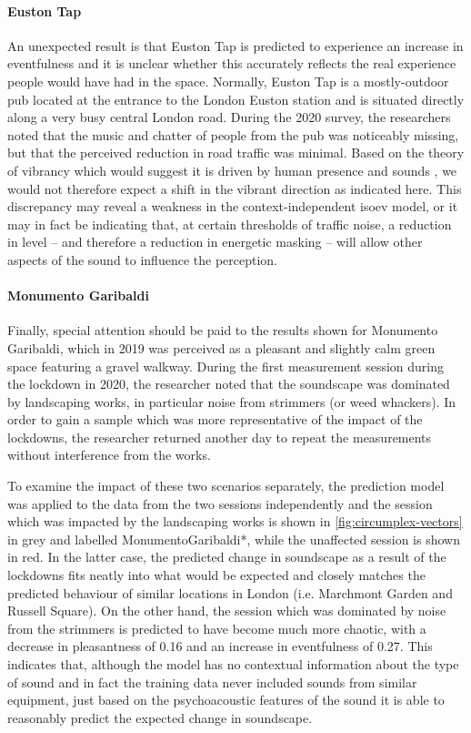    \paragraph{Euston Tap} An unexpected result is that Euston Tap is predicted to experience an increase in eventfulness and it is unclear whether this accurately reflects the real experience people would have had in the space. Normally, Euston Tap is a mostly-outdoor pub located at the entrance to the London Euston station and is situated directly along a very busy central London road. During the 2020 survey, the researchers noted that the music and chatter of people from the pub was noticeably missing, but that the perceived reduction in road traffic was minimal. Based on the theory of vibrancy which would suggest it is driven by human presence and sounds \citep{Aletta2018Towards}, we would not therefore expect a shift in the vibrant direction as indicated here. This discrepancy may reveal a weakness in the context-independent \gls{isoev} model, or it may in fact be indicating that, at certain thresholds of traffic noise, a reduction in level -- and therefore a reduction in energetic masking -- will allow other aspects of the sound to influence the perception.

   \paragraph{Monumento Garibaldi} Finally, special attention should be paid to the results shown for Monumento Garibaldi, which in 2019 was perceived as a pleasant and slightly calm green space featuring a gravel walkway. During the first measurement session during the lockdown in 2020, the researcher noted that the soundscape was dominated by landscaping works, in particular noise from strimmers (or weed whackers). In order to gain a sample which was more representative of the impact of the lockdowns, the researcher returned another day to repeat the measurements without interference from the works.

   To examine the impact of these two scenarios separately, the prediction model was applied to the data from the two sessions independently and the session which was impacted by the landscaping works is shown in \cref{fig:circumplex-vectors} in grey and labelled MonumentoGaribaldi*, while the unaffected session is shown in red. In the latter case, the predicted change in soundscape as a result of the lockdowns fits neatly into what would be expected and closely matches the predicted behaviour of similar locations in London (i.e. Marchmont Garden and Russell Square). On the other hand, the session which was dominated by noise from the strimmers is predicted to have become much more chaotic, with a decrease in pleasantness of 0.16 and an increase in eventfulness of 0.27. This indicates that, although the model has no contextual information about the type of sound and in fact the training data never included sounds from similar equipment, just based on the psychoacoustic features of the sound it is able to reasonably predict the expected change in soundscape.

